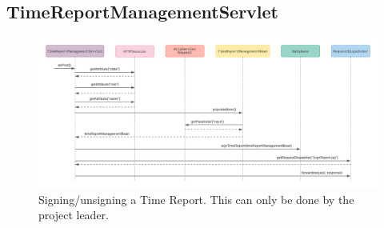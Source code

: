 \documentclass{article}
\begin{document}
\subsection{TimeReportManagementServlet}

\begin{figure}[H]
    \centering
    \includegraphics[scale=0.6]{images/signUnsignReports.png}
    \caption{Signing/unsigning a Time Report. This can only be done by the project leader.}
    \label{fig:signunsign}
\end{figure}



\end{document}
